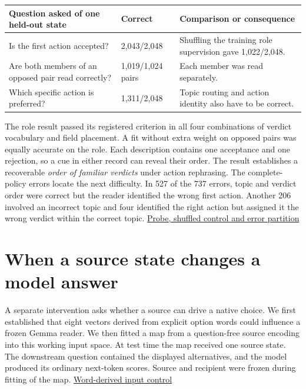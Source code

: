 \documentclass[11pt]{article}
\begin{document}
\begin{center}
\small\renewcommand{\arraystretch}{1.15}
\begin{tabular}{@{}p{.35\linewidth}p{.17\linewidth}p{.40\linewidth}@{}}
\toprule
Question asked of one held-out state & Correct & Comparison or consequence \\
\midrule
Is the first action accepted? & 2,043/2,048 & Shuffling the training role supervision gave 1,022/2,048. \\
Are both members of an opposed pair read correctly? & 1,019/1,024 pairs & Each member was read separately. \\
Which specific action is preferred? & 1,311/2,048 & Topic routing and action identity also have to be correct. \\
\bottomrule
\end{tabular}
\end{center}

The role result passed its registered criterion in all four combinations of verdict vocabulary and field placement. A fit without extra weight on opposed pairs was equally accurate on the role. Each description contains one acceptance and one rejection, so a cue in either record can reveal their order. The result establishes a recoverable \emph{order of familiar verdicts} under action rephrasing. The complete-policy errors locate the next difficulty. In 527 of the 737 errors, topic and verdict order were correct but the reader identified the wrong first action. Another 206 involved an incorrect topic and four identified the right action but assigned it the wrong verdict within the correct topic. \href{https://github.com/RyoSpiralArchitect/self-fold/blob/v1.0.0/provenance/role_exchange_20261103/RESULTS.md}{Probe, shuffled control and error partition}

\section{When a source state changes a model answer}

A separate intervention asks whether a source can drive a native choice. We first established that eight vectors derived from explicit option words could influence a frozen Gemma reader. We then fitted a map from a question-free source encoding into this working input space. At test time the map received one source state. The downstream question contained the displayed alternatives, and the model produced its ordinary next-token scores. Source and recipient were frozen during fitting of the map. \href{https://github.com/RyoSpiralArchitect/self-fold/blob/v1.0.0/provenance/slot_readout_20261103/RESULTS.md}{Word-derived input control}
\end{document}
